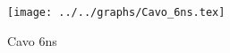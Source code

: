 \begin{figure}[h] \centering \texttt{[image: ../../graphs/Cavo\_6ns.tex]}\caption{Cavo 6ns}\label{gr:Cavo_6ns} \end{figure}

